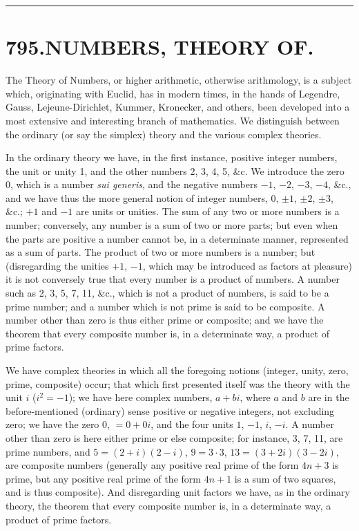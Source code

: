 \documentclass[11pt,a4paper]{article}
\begin{document}
\vspace{1em}
\hrule
\vspace{1em}



\section*{795.\quad NUMBERS, THEORY OF.}


\smallskip

The Theory of Numbers, or higher arithmetic, otherwise arithmology, is a subject which, originating with Euclid, has in modern times, in the hands of Legendre, Gauss, Lejeune-Dirichlet, Kummer, Kronecker, and others, been developed into a most extensive and interesting branch of mathematics. We distinguish between the ordinary (or say the simplex) theory and the various complex theories.

In the ordinary theory we have, in the first instance, positive integer numbers, the unit or unity 1, and the other numbers 2, 3, 4, 5, \&c. We introduce the zero 0, which is a number \textit{sui generis}, and the negative numbers $-1$, $-2$, $-3$, $-4$, \&c., and we have thus the more general notion of integer numbers, $0$, $\pm 1$, $\pm 2$, $\pm 3$, \&c.; $+1$ and $-1$ are units or unities. The sum of any two or more numbers is a number; conversely, any number is a sum of two or more parts; but even when the parts are positive a number cannot be, in a determinate manner, represented as a sum of parts. The product of two or more numbers is a number; but (disregarding the unities $+1$, $-1$, which may be introduced as factors at pleasure) it is not conversely true that every number is a product of numbers. A number such as 2, 3, 5, 7, 11, \&c., which is not a product of numbers, is said to be a prime number; and a number which is not prime is said to be composite. A number other than zero is thus either prime or composite; and we have the theorem that every composite number is, in a determinate way, a product of prime factors.

We have complex theories in which all the foregoing notions (integer, unity, zero, prime, composite) occur; that which first presented itself was the theory with the unit $i$ ($i^{2} = -1$); we have here complex numbers, $a + bi$, where $a$ and $b$ are in the before-mentioned (ordinary) sense positive or negative integers, not excluding zero; we have the zero $0$, $= 0 + 0i$, and the four units $1$, $-1$, $i$, $-i$. A number other than zero is here either prime or else composite; for instance, 3, 7, 11, are prime numbers, and $5 = (2 + i)(2 - i)$, $9 = 3 \cdot 3$, $13 = (3 + 2i)(3 - 2i)$, are composite numbers (generally any positive real prime of the form $4n + 3$ is prime, but any positive real prime of the form $4n + 1$ is a sum of two squares, and is thus composite). And disregarding unit factors we have, as in the ordinary theory, the theorem that every composite number is, in a determinate way, a product of prime factors.
\end{document}
